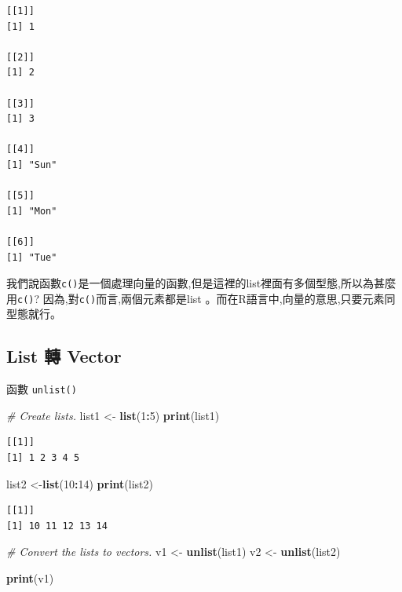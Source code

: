 \documentclass[]{book}
\newenvironment{Shaded}{\begin{snugshade}}{\end{snugshade}}
\newcommand{\CommentTok}[1]{\textcolor[rgb]{0.56,0.35,0.01}{\textit{#1}}}
\newcommand{\DecValTok}[1]{\textcolor[rgb]{0.00,0.00,0.81}{#1}}
\newcommand{\KeywordTok}[1]{\textcolor[rgb]{0.13,0.29,0.53}{\textbf{#1}}}
\newcommand{\NormalTok}[1]{#1}
\newcommand{\OperatorTok}[1]{\textcolor[rgb]{0.81,0.36,0.00}{\textbf{#1}}}
\newcommand{\StringTok}[1]{\textcolor[rgb]{0.31,0.60,0.02}{#1}}
\theoremstyle{definition}
\theoremstyle{definition}
\theoremstyle{definition}
\theoremstyle{remark}
\begin{document}
\begin{verbatim}
[[1]]
[1] 1

[[2]]
[1] 2

[[3]]
[1] 3

[[4]]
[1] "Sun"

[[5]]
[1] "Mon"

[[6]]
[1] "Tue"
\end{verbatim}

我們說函數\texttt{c()}是一個處理向量的函數,但是這裡的list裡面有多個型態,所以為甚麼用\texttt{c()}?
因為,對\texttt{c()}而言,兩個元素都是list
。而在R語言中,向量的意思,只要元素同型態就行。

\hypertarget{list--vector}{%
\subsection{List 轉 Vector}\label{list--vector}}

函數 \texttt{unlist()}

\begin{Shaded}
\begin{Highlighting}[]
\CommentTok{# Create lists.}
\NormalTok{list1 <-}\StringTok{ }\KeywordTok{list}\NormalTok{(}\DecValTok{1}\OperatorTok{:}\DecValTok{5}\NormalTok{)}
\KeywordTok{print}\NormalTok{(list1)}
\end{Highlighting}
\end{Shaded}

\begin{verbatim}
[[1]]
[1] 1 2 3 4 5
\end{verbatim}

\begin{Shaded}
\begin{Highlighting}[]
\NormalTok{list2 <-}\KeywordTok{list}\NormalTok{(}\DecValTok{10}\OperatorTok{:}\DecValTok{14}\NormalTok{)}
\KeywordTok{print}\NormalTok{(list2)}
\end{Highlighting}
\end{Shaded}

\begin{verbatim}
[[1]]
[1] 10 11 12 13 14
\end{verbatim}

\begin{Shaded}
\begin{Highlighting}[]
\CommentTok{# Convert the lists to vectors.}
\NormalTok{v1 <-}\StringTok{ }\KeywordTok{unlist}\NormalTok{(list1)}
\NormalTok{v2 <-}\StringTok{ }\KeywordTok{unlist}\NormalTok{(list2)}

\KeywordTok{print}\NormalTok{(v1)}
\end{Highlighting}
\end{Shaded}
\end{document}
